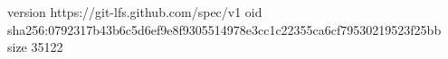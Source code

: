version https://git-lfs.github.com/spec/v1
oid sha256:0792317b43b6c5d6ef9e8f9305514978e3cc1c22355ca6cf79530219523f25bb
size 35122
